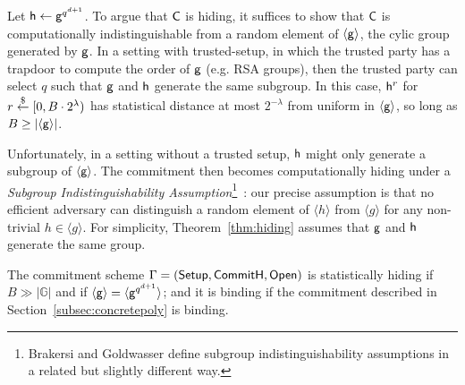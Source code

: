 Let $\mathsf{h} \leftarrow \mathsf{g}^{q^{d+1}}$. 
To argue that $\mathsf{C}$ is hiding, it suffices to show that $\mathsf{C}$ is computationally indistinguishable from a random element of $\langle \mathsf{g}\rangle$, the cylic group generated by $\mathsf{g}$. In a setting with trusted-setup, in which the trusted party has a trapdoor to compute the order of $\mathsf{g}$ (e.g. RSA groups), then the trusted party can select $q$ such that $\mathsf{g}$ and $\mathsf{h}$ generate the same subgroup. In this case, $\mathsf{h}^r$ for $r \overset{\$}{\gets} [0, B\cdot 2^\lambda)$ has statistical distance at most $2^{-\lambda}$ from uniform in $\langle \mathsf{g} \rangle$, so long as $B \geq |\langle \mathsf{g} \rangle|$. 


Unfortunately, in a setting without a trusted setup, $\mathsf{h}$ might only generate a subgroup of $\langle \mathsf{g} \rangle$. The commitment then becomes computationally hiding under a \emph{Subgroup Indistinguishability Assumption}\footnote{Brakersi and Goldwasser define subgroup indistinguishability assumptions in a related but slightly different way.}~\cite{C:BraGol10}: our precise assumption is that no efficient adversary can distinguish a random element of $\langle h \rangle$ from $\langle g \rangle$ for any non-trivial $h \in \langle g \rangle$. %
For simplicity, Theorem~\ref{thm:hiding} assumes that $\mathsf{g}$ and $\mathsf{h}$ generate the same group.

\begin{theorem}\label{thm:hiding}
The commitment scheme $\Gamma = (\textsf{{Setup}}, \textsf{{CommitH}}, \textsf{{Open}})$ is statistically hiding if $B \gg |\mathbb{G}|$ and if $\langle \mathsf{g} \rangle = \langle \mathsf{g}^{q^{d+1}} \rangle$; and it is binding if the commitment described in Section~\ref{subsec:concretepoly} is binding.
\end{theorem}

